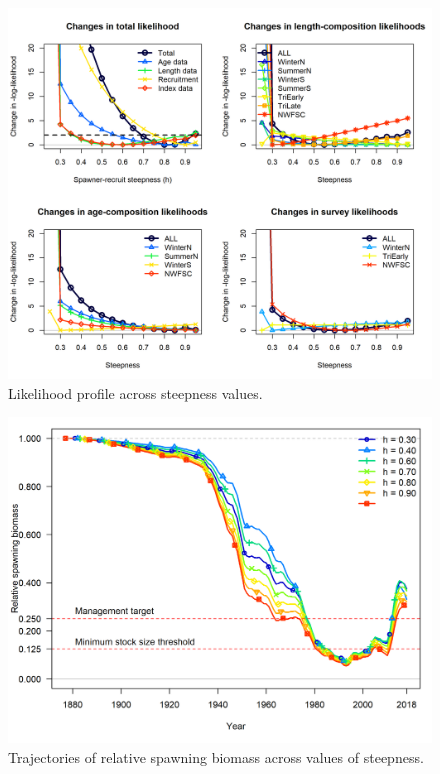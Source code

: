 \documentclass[12pt,]{article}
\begin{document}
\FloatBarrier

\begin{figure}
\centering
\includegraphics{Figures/piner_panel_h.png}
\caption{Likelihood profile across steepness values.
\label{fig:piner_h}}
\end{figure}

\FloatBarrier

\begin{figure}
\centering
\includegraphics{Figures/h_trajectories.png}
\caption{Trajectories of relative spawning biomass across values of
steepness. \label{fig:h_trajectory}}
\end{figure}
\end{document}
